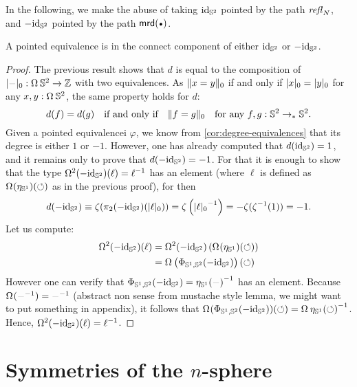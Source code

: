 \documentclass[english,a4]{article}
\newcommand{\ptdto}{\to_\ast}%
\newcommand{\setTrunc}[1]{\Trunc{#1}_0}
\newcommand{\settrunc}[1]{\trunc{#1}_0}
\begin{document}
In the following, we make the abuse of taking $\mathord{\mathrm{id}}_{{\mathbb S^{2}}}$ pointed by the path
$\mathop{{\mathit{refl}}_{N}}$, and $-\mathord{\mathrm{id}}_{{\mathbb S^{2}}}$ pointed by the path $\mrd(\base)$.
\begin{corollary}
  A pointed equivalence is in the connect component of either $\mathord{\mathrm{id}}_{{\mathbb S^{2}}}$ or $-\mathord{\mathrm{id}}_{{\mathbb S^{2}}}$.
  \label{cor:equivalence-conn-component}
\end{corollary}
\begin{proof}
  The previous result shows that $d$ is equal to the composition of
  $\settrunc\blank:\loopspace\null\Sp \to\ZZ$ with two equivalences. As
  $\setTrunc{x = y}$ if and only if $\settrunc x = \settrunc y$ for any
  $x,y:\loopspace\null \Sp$, the same property holds for $d$:
  \begin{displaymath}
    d(f) = d(g) \quad \text{if and only if}\quad
    \setTrunc{f = g} \quad \text{for any}\ f,g:\Sp \ptdto\Sp.
  \end{displaymath}
  Given a pointed equivalencei $\varphi$, we know from
  \cref{cor:degree-equivalences} that its degree is either $1$ or $-1$.
  However, one has already computed that $d(\mathord{\mathrm{id}}_{{\mathbb S^{2}}}) = 1$, and it remains only
  to prove that $d(-\mathord{\mathrm{id}}_{{\mathbb S^{2}}}) = -1$. For that it is enough to show that the type
  $\mathop{\Omega^{2}} (-\mathord{\mathrm{id}}_{{\mathbb S^{2}}})(\ell) = {\ell}^{-1}$ has an element (where $\ell$ is
  defined as $\loopspace\null(\eta_\Sc)(\Sloop)$ as in the previous proof), for
  then
  \begin{displaymath}
    d(-\id_\Sp) \jdeq \zeta(\pi_2(-\id_\Sp)(\settrunc{\ell})) = \zeta\left( \inv{\settrunc\ell} \right) = - \zeta(\inv\zeta(1)) = -1.
  \end{displaymath}
  Let us compute:
  \begin{align*}
    \loopspace 2 (-\id_\Sp)(\ell) &= \loopspace 2 (-\id_\Sp) \left( \loopspace\null(\eta_\Sc)(\Sloop) \right)
    \\
    &= \loopspace\null \left( \Phi_{\Sc,\Sp}(-\id_\Sp) \right)(\Sloop)
  \end{align*}
  However one can verify that $\Phi_{\Sc,\Sp}(-\id_\Sp) =
  \inv{\eta_\Sc(\blank)}$ has an element. Because $\loopspace\null(\inv\blank)
  = \inv\blank$ ({\color{red}abstract non sense from mustache style lemma, we
  might want to put something in appendix}), it follows that
  $\loopspace\null(\Phi_{\Sc,\Sp}(-\id_\Sp))(\Sloop) =
  \inv{\loopspace\null\eta_\Sc(\Sloop)}$. Hence, $\mathop{\Omega^{2}} (-\mathord{\mathrm{id}}_{{\mathbb S^{2}}})(\ell)
  = {\ell}^{-1}$.
\end{proof}

\section{Symmetries of the $n$-sphere}
\label{sec:higher-sphere}




\end{document}
